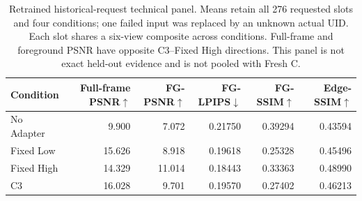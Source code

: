 \documentclass[times,twocolumn,final]{elsarticle}
\providecommand{\DIFaddbegin}{} %
\providecommand{\DIFaddend}{} %
\providecommand{\DIFdelbegin}{} %
\providecommand{\DIFdelend}{} %
\begin{document}
\DIFdelbegin %
\DIFdelend \DIFaddbegin \begin{table}[t]
\centering\scriptsize\setlength{\tabcolsep}{5pt}
\caption{Retrained historical-request technical panel. Means retain all 276 requested slots and four conditions; one failed input was replaced by an unknown actual UID. Each slot shares a six-view composite across conditions. Full-frame and foreground PSNR have opposite C3--Fixed High directions. This panel is not exact held-out evidence and is not pooled with Fresh C.}
\label{tab:original276}
\begin{tabular}{lrrrrr}
\toprule Condition & Full-frame PSNR$\uparrow$ & FG-PSNR$\uparrow$ & FG-LPIPS$\downarrow$ & FG-SSIM$\uparrow$ & Edge-SSIM$\uparrow$ \\
\midrule
No Adapter & 9.900 & 7.072 & 0.21750 & 0.39294 & 0.43594 \\
Fixed Low & 15.626 & 8.918 & 0.19618 & 0.25328 & 0.45496 \\
Fixed High & 14.329 & 11.014 & 0.18443 & 0.33363 & 0.48990 \\
C3 & 16.028 & 9.701 & 0.19570 & 0.27402 & 0.46213 \\

\bottomrule
\end{tabular}
\end{table}
\DIFaddend 
\end{document}
